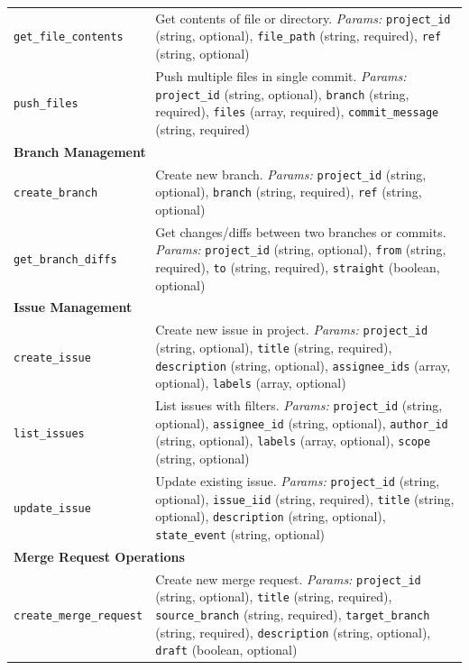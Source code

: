 \documentclass{article}
\theoremstyle{plain}
\theoremstyle{definition}
\theoremstyle{remark}
\begin{document}
{\begin{longtable}{p{4.5cm} p{10cm}}
\texttt{get\_file\_contents} & Get contents of file or directory. \textit{Params:} \texttt{project\_id} (string, optional), \texttt{file\_path} (string, required), \texttt{ref} (string, optional) \\

\texttt{push\_files} & Push multiple files in single commit. \textit{Params:} \texttt{project\_id} (string, optional), \texttt{branch} (string, required), \texttt{files} (array, required), \texttt{commit\_message} (string, required) \\

\multicolumn{2}{l}{\textbf{Branch Management}} \\
\texttt{create\_branch} & Create new branch. \textit{Params:} \texttt{project\_id} (string, optional), \texttt{branch} (string, required), \texttt{ref} (string, optional) \\

\texttt{get\_branch\_diffs} & Get changes/diffs between two branches or commits. \textit{Params:} \texttt{project\_id} (string, optional), \texttt{from} (string, required), \texttt{to} (string, required), \texttt{straight} (boolean, optional) \\

\multicolumn{2}{l}{\textbf{Issue Management}} \\
\texttt{create\_issue} & Create new issue in project. \textit{Params:} \texttt{project\_id} (string, optional), \texttt{title} (string, required), \texttt{description} (string, optional), \texttt{assignee\_ids} (array, optional), \texttt{labels} (array, optional) \\

\texttt{list\_issues} & List issues with filters. \textit{Params:} \texttt{project\_id} (string, optional), \texttt{assignee\_id} (string, optional), \texttt{author\_id} (string, optional), \texttt{labels} (array, optional), \texttt{scope} (string, optional) \\

\texttt{update\_issue} & Update existing issue. \textit{Params:} \texttt{project\_id} (string, optional), \texttt{issue\_iid} (string, required), \texttt{title} (string, optional), \texttt{description} (string, optional), \texttt{state\_event} (string, optional) \\

\multicolumn{2}{l}{\textbf{Merge Request Operations}} \\
\texttt{create\_merge\_request} & Create new merge request. \textit{Params:} \texttt{project\_id} (string, optional), \texttt{title} (string, required), \texttt{source\_branch} (string, required), \texttt{target\_branch} (string, required), \texttt{description} (string, optional), \texttt{draft} (boolean, optional) \\


\end{longtable}}
\end{document}
